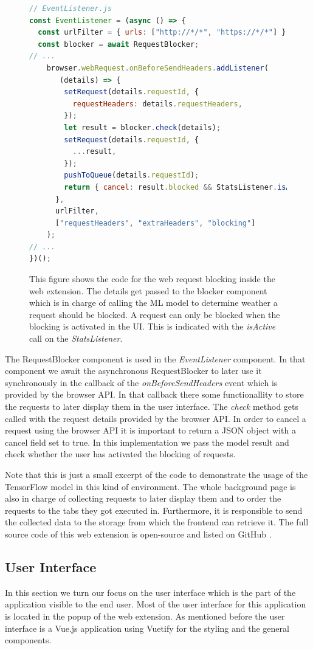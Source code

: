 \begin{figure}[ht!]
\begin{lstlisting}[language=JavaScript]
// EventListener.js
const EventListener = (async () => {
  const urlFilter = { urls: ["http://*/*", "https://*/*"] };
  const blocker = await RequestBlocker;
// ...
    browser.webRequest.onBeforeSendHeaders.addListener(
       (details) => {
        setRequest(details.requestId, {
          requestHeaders: details.requestHeaders,
        });
        let result = blocker.check(details);
        setRequest(details.requestId, {
          ...result,
        });
        pushToQueue(details.requestId);
        return { cancel: result.blocked && StatsListener.isActive() };
      },
      urlFilter,
      ["requestHeaders", "extraHeaders", "blocking"]
    );
// ...
})();
\end{lstlisting}
\caption{This figure shows the code for the web request blocking inside the web extension. The details get passed to the blocker component 
  which is in charge of calling the ML model to determine weather a request should be blocked. A request can only be blocked when the blocking is
  activated in the UI. This is indicated with the \emph{isActive} call on the \emph{StatsListener}.
}
\end{figure}

The RequestBlocker component is used in the \emph{EventListener} component. In that component we await the asynchronous RequestBlocker to later
use it synchronously in the callback of the \emph{onBeforeSendHeaders} event which is provided by the browser API. In that callback there 
some functionallity to store the requests to later display them in the user interface. The \emph{check} method gets called with the request details
provided by the browser API. In order to cancel a request using the browser API it is important to return a JSON object with a cancel field set
to true. In this implementation we pass the model result and check whether the user has activated the blocking of requests.

Note that this is just a small excerpt of the code to demonstrate the usage of the TensorFlow model in this kind of environment. The whole background page
is also in charge of collecting requests to later display them and to order the requests to the tabs they got executed in. Furthermore, it is 
responsible to send the collected data to the storage from which the frontend can retrieve it. The full source code of this web extension is open-source
and listed on GitHub \cite{trackingDetector}.
\subsection{User Interface}
In this section we turn our focus on the user interface which is the part of the application visible to the end user. Most of the user 
interface for this application is located in the popup of the web extension. As mentioned before the user interface is a Vue.js application
using Vuetify for the styling and the general components.


